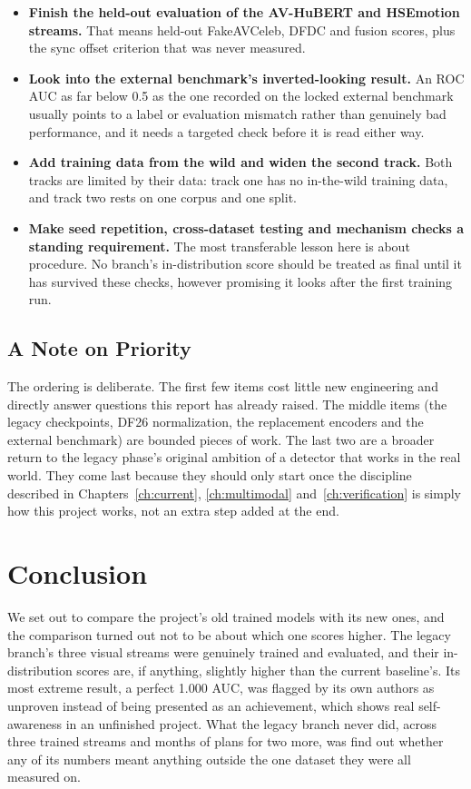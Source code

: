 \begin{itemize}
{    normalization.} Until then, the Perception Encoder and CLIP results remain
    provisional.
    \item \textbf{Finish the held-out evaluation of the AV-HuBERT and HSEmotion
    streams.} That means held-out FakeAVCeleb, DFDC and fusion scores, plus the
    sync offset criterion that was never measured.
    \item \textbf{Look into the external benchmark's inverted-looking result.}
    An ROC AUC as far below 0.5 as the one recorded on the locked external
    benchmark usually points to a label or evaluation mismatch rather than
    genuinely bad performance, and it needs a targeted check before it is read
    either way.
    \item \textbf{Add training data from the wild and widen the second track.}
    Both tracks are limited by their data: track one has no in-the-wild
    training data, and track two rests on one corpus and one split.
    \item \textbf{Make seed repetition, cross-dataset testing and mechanism
    checks a standing requirement.} The most transferable lesson here is about
    procedure. No branch's in-distribution score should be treated as final
    until it has survived these checks, however promising it looks after the
    first training run.
\end{itemize}

\section{A Note on Priority}

The ordering is deliberate. The first few items cost little new engineering
and directly answer questions this report has already raised. The middle items
(the legacy checkpoints, DF26 normalization, the replacement encoders and the
external benchmark) are bounded pieces of work. The last two are a broader
return to the legacy phase's original ambition of a detector that works in the
real world. They come last because they should only start once the discipline
described in Chapters~\ref{ch:current}, \ref{ch:multimodal}
and~\ref{ch:verification} is simply how this project works, not an extra step
added at the end.

\chapter{Conclusion}
\label{ch:conclusions}

We set out to compare the project's old trained models with its new ones, and
the comparison turned out not to be about which one scores higher. The legacy
branch's three visual streams were genuinely trained and evaluated, and their
in-distribution scores are, if anything, slightly higher than the current
baseline's. Its most extreme result, a perfect 1.000 AUC, was flagged by its
own authors as unproven instead of being presented as an achievement, which
shows real self-awareness in an unfinished project. What the legacy branch
never did, across three trained streams and months of plans for two more, was
find out whether any of its numbers meant anything outside the one dataset they
were all measured on.

